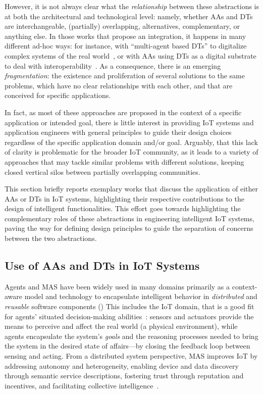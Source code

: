However, it is not always clear what the \emph{relationship} between these abstractions is at both the architectural and technological level: namely, whether AAs and DTs are interchangeable, (partially) overlapping, alternatives, complementary, or anything else. 
%
In those works that propose an integration, it happens in many different ad-hoc ways: for instance, with ``multi-agent based DTs'' to digitalize complex systems of the real world~\cite{Pretel_Zhinin-Vera_Navarro_López-Jaquero_González_2025}, or with AAs using DTs as a digital substrate to deal with interoperability~\cite{web-of-dt-ricci-2022}. 
%
As a consequence, there is an emerging \emph{fragmentation}: the existence and proliferation of several solutions to the same problems, which have no clear relationships with each other, and that are conceived for specific applications. 

In fact, as most of these approaches are proposed in the context of a specific application or intended goal, there is little interest in providing IoT systems and application engineers with general principles to guide their design choices regardless of the specific application domain and/or goal. 
%
Arguably, that this lack of clarity is problematic for the broader IoT community, as it leads to a variety of approaches that may tackle similar problems with different solutions, keeping closed vertical silos between partially overlapping communities.

This section briefly reports exemplary works that discuss the application of either AAs or DTs in \ac{IoT} systems, highlighting their respective contributions to the design of intelligent functionalities.
%
This effort goes towards highlighting the complementary roles of these abstractions in engineering intelligent IoT systems, paving the way for defining design principles to guide the separation of concerns between the two abstractions. 

\subsection{Use of AAs and DTs in IoT Systems}

Agents and MAS have been widely used in many domains primarily as a context-aware model and technology to encapsulate intelligent behavior in \emph{distributed} and \emph{reusable} software components ()
%
This includes the IoT domain, 
that is a good fit for agents' situated decision-making abilities~\cite{Savaglio2020}: sensors and actuators provide the means to perceive and affect the real world (a physical environment), while agents encapsulate the system's \emph{goals} and the reasoning processes needed to bring the system in the desired state of affairs---by closing the feedback loop between sensing and acting.
%
From a distributed system perspective, MAS improves IoT by addressing autonomy and heterogeneity, enabling device and data discovery through semantic service descriptions, fostering trust through reputation and incentives, and facilitating collective intelligence~\cite{Singh_Chopra_2017}. 

